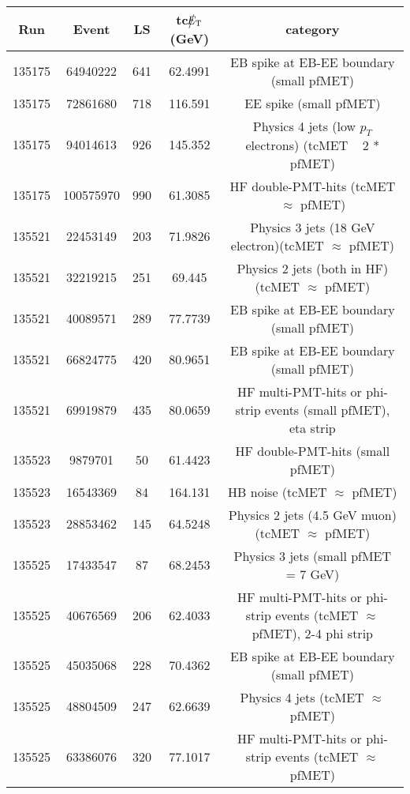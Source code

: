\begin{table}[htbp]
  \begin{center}
    \begin{tabular}{|c|c|c|c|c|}
      \hline
      Run & Event & LS & tc$\big\slash\hspace{-1.6ex}{E_\text{T}}$ (GeV) & category \\     
      \hline
      135175  & 64940222     & 641  &    62.4991 & EB spike at EB-EE boundary (small pfMET) \\
      135175  & 72861680     & 718  &    116.591 & EE spike (small pfMET) \\
      135175  & 94014613     & 926  &    145.352 & Physics 4 jets (low $p_T$ electrons) (tcMET ~ 2 * pfMET) \\
      135175  & 100575970    & 990  &    61.3085 & HF double-PMT-hits (tcMET $\approx$ pfMET) \\
      135521  & 22453149     & 203  &    71.9826 & Physics 3 jets (18 GeV electron)(tcMET $\approx$ pfMET) \\
      135521  & 32219215     & 251  &    69.445  & Physics 2 jets (both in HF) (tcMET $\approx$ pfMET) \\
      135521  & 40089571     & 289  &    77.7739 & EB spike at EB-EE boundary (small pfMET) \\
      135521  & 66824775     & 420  &    80.9651 & EB spike at EB-EE boundary (small pfMET) \\
      135521  & 69919879     & 435  &    80.0659 & HF multi-PMT-hits or phi-strip events (small pfMET), eta strip \\
      135523  & 9879701      & 50   &    61.4423 & HF double-PMT-hits (small pfMET) \\
      135523  & 16543369     & 84   &    164.131 & HB noise (tcMET $\approx$ pfMET) \\
      135523  & 28853462     & 145  &    64.5248 & Physics 2 jets (4.5 GeV muon) (tcMET $\approx$ pfMET) \\
      135525  & 17433547     & 87   &    68.2453 & Physics 3 jets (small pfMET = 7 GeV) \\ 
      135525  & 40676569     & 206  &    62.4033 & HF multi-PMT-hits or phi-strip events (tcMET $\approx$ pfMET), 2-4 phi strip \\
      135525  & 45035068     & 228  &    70.4362 & EB spike at EB-EE boundary (small pfMET) \\
      135525  & 48804509     & 247  &    62.6639 & Physics 4 jets (tcMET $\approx$ pfMET) \\
      135525  & 63386076     & 320  &    77.1017 & HF multi-PMT-hits or phi-strip events (tcMET $\approx$ pfMET) \\

\end{tabular}
\end{center}
\end{table}
